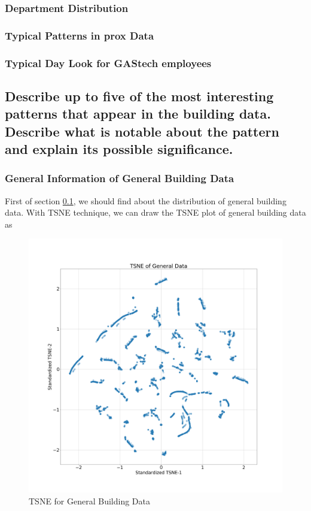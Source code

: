 \documentclass[aps, 10pt, a4paper]{article}
\begin{document}
            \subsubsection{Department Distribution}
            
            \subsubsection{Typical Patterns in prox Data}
            
            \subsubsection{Typical Day Look for GAStech employees}
        
        \subsection[Question 2]{Describe up to five of the most interesting patterns that appear in the building data. Describe what is notable about the pattern and explain its possible significance.}
            \label{sec:question2}
            \subsubsection{General Information of General Building Data}
                First of section \ref{sec:question2}, we should find about the distribution of general building data. With TSNE technique, we can draw the TSNE plot of general building data as 
                
                \begin{figure}[htbp]
                    \centering
                    \includegraphics[width=0.4 \linewidth]{figures/TsneGeneral.png}
                    \caption{TSNE for General Building Data}
                    \label{fig:tsnegeneral}
                \end{figure}
            
\end{document}
